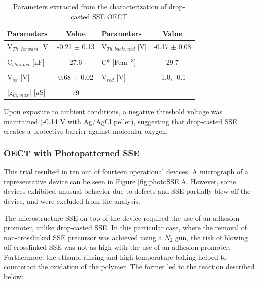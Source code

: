 \begin{table}[ht]
\centering
\caption{Parameters extracted from the characterization of drop-casted SSE OECT}
\begin{tabular}{l|c||l|c}
Parameters & Value & Parameters & Value \\\hline \hline
V$_{Th,forward}$ [V] & -0.21 $\pm$ 0.13 & V$_{Th,backward}$ [V] & -0.17 $\pm$ 0.08\\
& & &\\[-1em]
C$_{channel}$ [nF] & 27.6 & C* [Fcm$^{-3}$] & 29.7 \\
& & &\\[-1em]
V$_{ox}$ [V] & 0.68 $\pm$ 0.02 & V$_{red}$ [V] & -1.0, -0.1 \\
& & &\\[-1em]
|g$_{m,max}$| [$\mu$S] & 79 &  &\\\hline
\end{tabular}
\label{tab:dropfom}
\end{table}

Upon exposure to ambient conditions, a negative threshold voltage was maintained (-0.14 V with Ag/AgCl pellet), suggesting that drop-casted SSE creates a protective barrier against molecular oxygen.%

\subsubsection{OECT with Photopatterned SSE} %
This trial resulted in ten out of fourteen operational devices. A micrograph of a representative device can be seen in Figure \ref{fig:photoSSE}A. However, some devices exhibited unusual behavior due to defects and SSE partially blew off the device, and were excluded from the analysis.

The microstructure SSE on top of the device required the use of an adhesion promoter, unlike drop-casted SSE. In this particular case, where the removal of non-crosslinked SSE precursor was achieved using a $N_{2}$ gun, the risk of blowing off crosslinked SSE was not as high with the use of an adhesion promoter. Furthermore, the ethanol rinsing and high-temperature baking helped to counteract the oxidation of the polymer. The former led to the reaction described below: \\

